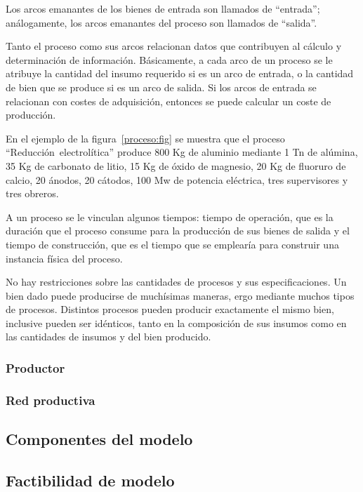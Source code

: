 \documentclass[11pt,spanish,letter]{article}
\begin{document}
   Los arcos emanantes de los bienes de entrada son llamados de
   \mbox{``entrada''}; análogamente, los arcos emanantes del proceso son
   llamados de \mbox{``salida''}.

   Tanto el proceso como sus arcos relacionan datos que contribuyen al
   cálculo y determinación de información. Básicamente, a cada arco de un
   proceso se le atribuye la cantidad del insumo requerido si es un
   arco de entrada, o la cantidad de bien que se produce si es un arco de
   salida. Si los arcos de entrada se relacionan con costes de
   adquisición, entonces se puede calcular un coste de producción.

   En el ejemplo de la figura~\ref{proceso:fig} se muestra que el proceso
   ``Reducción~electrolítica'' produce 800 Kg de aluminio mediante 1 Tn
   de alúmina, 35 Kg de carbonato de litio, 15 Kg de óxido de magnesio,
   20 Kg de fluoruro de calcio, 20 ánodos, 20 cátodos, 100 Mw de potencia
   eléctrica, tres supervisores y tres obreros.

   A un proceso se le vinculan algunos tiempos: tiempo de operación, que
   es la duración que el proceso consume para la producción de sus
   bienes de salida y el tiempo de construcción, que es el tiempo que se
   emplearía para construir una instancia física del proceso. 

   No hay restricciones sobre las cantidades de procesos y sus
   especificaciones. Un bien dado puede producirse de muchísimas maneras,
   ergo mediante muchos tipos de procesos. Distintos procesos pueden
   producir exactamente el mismo bien, inclusive pueden ser idénticos,
   tanto en la composición de sus insumos como en las cantidades de
   insumos y del bien producido.

   \subsubsection{Productor}\label{productor:sec}



   \subsubsection{Red productiva}

   \subsection{Componentes del modelo}

  \subsection{Factibilidad de modelo}
\end{document}
